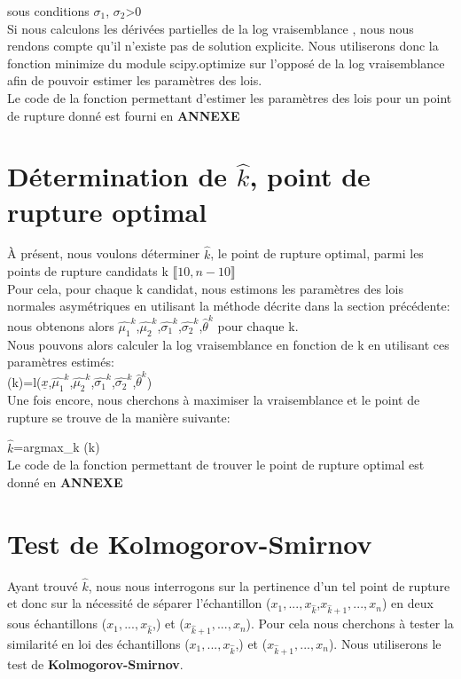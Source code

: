 {sous conditions $\sigma_1$, $\sigma_2$>0 \\

Si nous calculons les dérivées partielles de la log vraisemblance , nous nous rendons compte qu'il n'existe pas de solution explicite. Nous utiliserons donc la fonction minimize du module scipy.optimize sur l'opposé de la log vraisemblance afin de pouvoir estimer les paramètres des lois. \\

Le code de la fonction permettant d'estimer les paramètres des lois pour un point de rupture donné est fourni en \textbf{ANNEXE}

\section{Détermination de $\hat{k}$, point de rupture optimal}

À présent, nous voulons déterminer $\hat{k}$, le point de rupture optimal, parmi les points de rupture candidats k \in  $\llbracket 10, n-10 \rrbracket$\\

Pour cela, pour chaque k candidat, nous estimons les paramètres des lois normales asymétriques en utilisant la méthode décrite dans la section précédente: nous obtenons alors $\hat{\mu_1}^k$,$\hat{\mu_2}^k$,$\hat{\sigma_1}^k$,$\hat{\sigma_2}^k$,$\hat{\theta}^k$ pour chaque k.\\
Nous pouvons alors calculer la log vraisemblance en fonction de k en utilisant ces paramètres estimés:\\
\Lambda(k)=l($\underline{x}$,$\hat{\mu_1}^k$,$\hat{\mu_2}^k$,$\hat{\sigma_1}^k$,$\hat{\sigma_2}^k$,$\hat{\theta}^k$)\\

Une fois encore, nous cherchons à maximiser la vraisemblance et le point de rupture se trouve de la manière suivante:

$\hat{k}$=\hspace{0.05cm}argmax_{k} \hspace{0.1cm}\Lambda(k)\\

Le code de la fonction permettant de trouver le point de rupture optimal est donné en \textbf{ANNEXE}

\section{Test de Kolmogorov-Smirnov}

Ayant trouvé $\hat{k}$, nous nous interrogons sur la pertinence d'un tel point de rupture et donc sur la nécessité de séparer l'échantillon ($x_1, ..., x_{\hat{k}}$,$x_{\hat{k}+1},..., x_n$) en deux sous échantillons ($x_1, ..., x_{\hat{k}}$,) et ($x_{\hat{k}+1}, ..., x_n$). Pour cela nous cherchons à tester la similarité en loi des échantillons ($x_1, ..., x_{\hat{k}}$,) et ($x_{\hat{k}+1}, ..., x_n$). Nous utiliserons le test de \textbf{Kolmogorov-Smirnov}.\\

}
